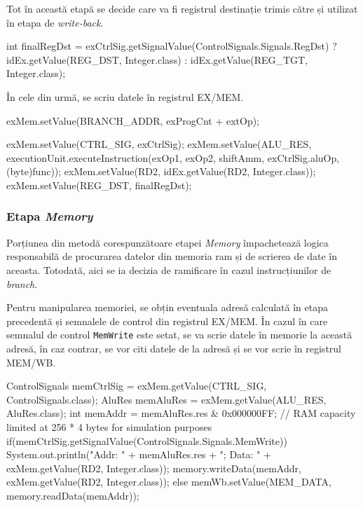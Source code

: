 \documentclass{article}
\begin{document}
Tot în această etapă se decide care va fi registrul destinație trimis către și utilizat în etapa de \textit{write-back}.

\begin{javacodebox}
int finalRegDst = exCtrlSig.getSignalValue(ControlSignals.Signals.RegDst)
    ? idEx.getValue(REG_DST, Integer.class)
    : idEx.getValue(REG_TGT, Integer.class);
\end{javacodebox}

În cele din urmă, se scriu datele în registrul EX/MEM.

\begin{javacodebox}
exMem.setValue(BRANCH_ADDR, exProgCnt + extOp);
\end{javacodebox}

\begin{javacodebox}
exMem.setValue(CTRL_SIG, exCtrlSig);
exMem.setValue(ALU_RES, executionUnit.executeInstruction(exOp1, exOp2, shiftAmm, exCtrlSig.aluOp, (byte)func));
exMem.setValue(RD2, idEx.getValue(RD2, Integer.class));
exMem.setValue(REG_DST, finalRegDst);
\end{javacodebox}

\subsubsection{Etapa \textit{Memory}}
Porțiunea din metodă corespunzătoare etapei \textit{Memory} împachetează logica responsabilă de procurarea datelor din memoria ram și de scrierea de date în aceasta. Totodată, aici se ia decizia de ramificare în cazul instrucțiunilor de \textit{branch}.

Pentru manipularea memoriei, se obțin eventuala adresă calculată în etapa precedentă și semnalele de control din registrul EX/MEM. În cazul în care semnalul de control \texttt{MemWrite} este setat, se va scrie datele în memorie la această adresă, în caz contrar, se vor citi datele de la adresă și se vor scrie în registrul MEM/WB.

\begin{javacodebox}
ControlSignals memCtrlSig = exMem.getValue(CTRL_SIG, ControlSignals.class);
AluRes memAluRes = exMem.getValue(ALU_RES, AluRes.class);
int memAddr = memAluRes.res & 0x000000FF; // RAM capacity limited at 256 * 4 bytes for simulation purposes
if(memCtrlSig.getSignalValue(ControlSignals.Signals.MemWrite))
{
    System.out.println("Addr: " + memAluRes.res + "; Data: " + exMem.getValue(RD2, Integer.class));
    memory.writeData(memAddr, exMem.getValue(RD2, Integer.class));
}
else
{
    memWb.setValue(MEM_DATA, memory.readData(memAddr)); 
}
\end{javacodebox}
\end{document}
